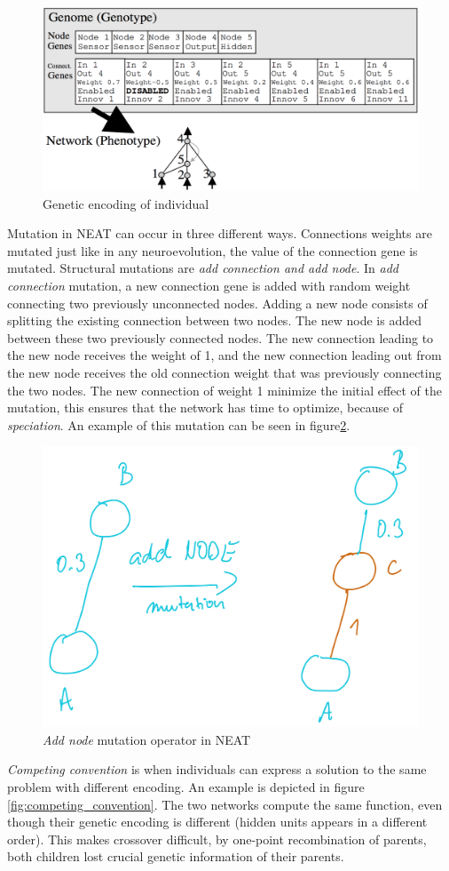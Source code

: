 \documentclass[format=acmsmall, review=false, screen=true]{acmart}
\begin{document}
\begin{figure}[H]
  \includegraphics[width=0.66\linewidth]{img/neat_encoding.PNG}
  \caption{\label{fig:genome}Genetic encoding of individual}
\end{figure}

Mutation in NEAT can occur in three different ways. Connections weights are mutated just like in any neuroevolution, the value of the connection gene is mutated. Structural mutations are \emph{add connection and add node}. In \emph{add connection} mutation, a new connection gene is added with random weight connecting two previously unconnected nodes. Adding a new node consists of splitting the existing connection between two nodes. The new node is added between these two previously connected nodes. The new connection leading to the new node receives the weight of 1, and the new connection leading out from the new node receives the old connection weight that was previously connecting the two nodes. The new connection of weight 1 minimize the initial effect of the mutation, this ensures that the network has time to optimize, because of \emph{speciation}. An example of this mutation can be seen in figure\ref{fig:add_node}.

\begin{figure}[H]
  \includegraphics[width=0.56\linewidth]{img/add_node.JPEG}
  \caption{\label{fig:add_node}\emph{Add node} mutation operator in NEAT}
\end{figure}

\emph{Competing convention} is when individuals can express a solution to the same problem with different encoding. An example is depicted in figure \ref{fig:competing_convention}. The two networks compute the same function, even though their genetic encoding is different (hidden units appears in a different order). This makes crossover difficult, by one-point recombination of parents, both children lost crucial genetic information of their parents.
\end{document}
